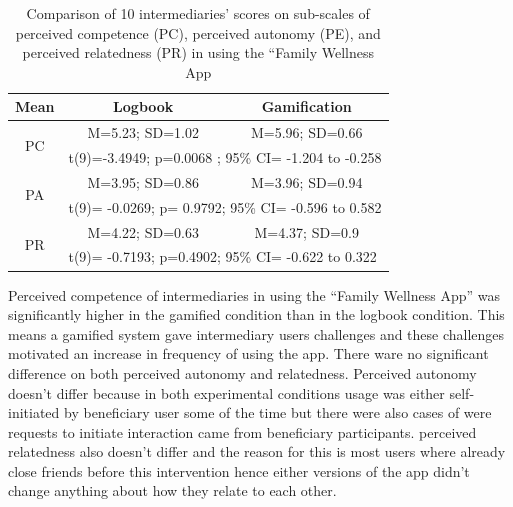 \documentclass{sig-alternate}
\begin{document}
\begin{table}[h!]
  \begin{center}
    \caption{Comparison of 10 intermediaries' scores on sub-scales of perceived competence (PC), perceived autonomy (PE), and perceived relatedness (PR) in using the ``Family Wellness App}
    \label{table:imiwellnessinterm}
	\begin{tabular}{|c|c|c|}
		\hline
		Mean &Logbook&Gamification\\
		\hline
		 \multirow{2}{*}{PC}&M=5.23; SD=1.02&M=5.96; SD=0.66\\\cline{2-3} 

		 &\multicolumn{2}{|l|}{t(9)=-3.4949; p=0.0068 ; 95\% CI= -1.204 to -0.258} \\
\hline
		 \multirow{2}{*}{PA}&M=3.95; SD=0.86&M=3.96; SD=0.94\\\cline{2-3} 

		 &\multicolumn{2}{|l|}{t(9)= -0.0269; p= 0.9792; 95\% CI= -0.596 to 0.582} \\
\hline

		 \multirow{2}{*}{PR}&M=4.22; SD=0.63&M=4.37; SD=0.9\\\cline{2-3} 
		 &\multicolumn{2}{|l|}{t(9)= -0.7193; p=0.4902; 95\% CI= -0.622 to 0.322 } \\
\hline
	\end{tabular}
  \end{center}
\end{table}
\newline
Perceived competence of intermediaries in using the ``Family Wellness App'' was significantly higher in the gamified condition than in the logbook condition. This means a gamified system gave intermediary users challenges and these challenges motivated an increase in frequency of using the app. There ware no significant difference on both perceived autonomy and relatedness. Perceived autonomy doesn't differ because in both experimental conditions usage was either self-initiated by beneficiary user some of the time but there were also cases of were requests to initiate interaction came from beneficiary participants. perceived relatedness also doesn't differ and the reason for this is most users where already close friends before this intervention hence either versions of the app didn't change anything about how they relate to each other.\newline  
\end{document}
